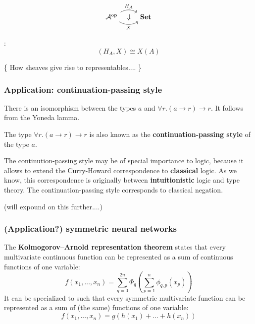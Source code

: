 \begin{equation}
\begin{tikzcd}
\mathcal{A}^{\mathrm{op}} 
\arrow[r, bend left=30, "H_A"]
\arrow[r, bend right=30, swap, "X"]
\arrow[r, phantom, "\Downarrow"]
& \mathbf{Set}
\end{tikzcd}
\end{equation}

:
\begin{equation}
[\mathcal{A}^{\mathrm{op}} , \mathbf{Set}] (H_A, X) \cong X(A)
\end{equation}

\{ How sheaves give rise to representables.... \}

\subsubsection{Application: continuation-passing style}

There is an isomorphism between the types $a$ and $\forall r. (a \rightarrow r) \rightarrow r$.  It follows from the Yoneda lamma.

The type $\forall r. (a \rightarrow r) \rightarrow r$ is also known as the \textbf{continuation-passing style} of the type $a$.

The continution-passing style may be of special importance to logic, because it allows to extend the Curry-Howard correspondence to \textbf{classical} logic.  As we know, this correspondence is originally between \textbf{intuitionistic} logic and type theory.  The continuation-passing style corresponds to classical negation. 

(will expound on this further....)

\subsubsection{(Application?) symmetric neural networks}


The \textbf{Kolmogorov–Arnold representation theorem} states that every multivariate continuous function can be represented as a sum of continuous functions of one variable:
\begin{equation}
f(x_1,... ,x_n) = \sum_{q=0}^{2n}\Phi_{q} \left(\sum_{p=1}^n \phi_{q,p}(x_p) \right)
\end{equation}
It can be specialized to such that every symmetric multivariate function can be represented as a sum of (the same) functions of one variable:
\begin{equation}
\label{symmetric-functions}
f(x_1, ..., x_n) = g(h(x_1) + ... + h(x_n))
\end{equation}

